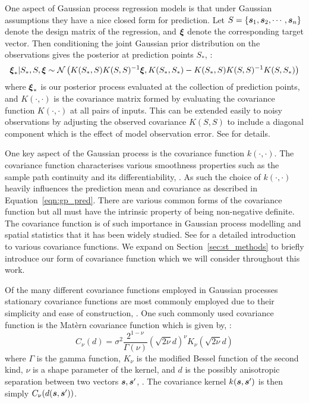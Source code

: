 One aspect of Gaussian process regression models is that under Gaussian assumptions they have a nice closed form for prediction. Let $S = \{ \bm{{s}}_{1}, \bm{{s}}_{2}, \cdots, \bm{{s}}_{n}\}$ denote the design matrix of the regression, and $\bm{{\xi}}$ denote the corresponding target vector. Then conditioning the joint Gaussian prior distribution on the observations gives the posterior at prediction points $S_*$, \citep{williams_gaussian_2006}:
\begin{equation}\label{eqn:gp_pred}
	\bm{{\xi}}_{*} | S_{*}, S, \bm{{\xi}} \sim \mathcal{N}\left(K(S_*, S)K(S, S)^{-1} \bm{{\xi}}, K(S_*, S_*) - K(S_*, S)K(S, S)^{-1}K(S, S_*)\right)
\end{equation}
where $\bm{{\xi}}_{*}$ is our posterior process evaluated at the collection of prediction points, and $K(\cdot, \cdot)$ is the covariance matrix formed by evaluating the covariance function $K(\cdot, \cdot)$ at all pairs of inputs. This can be extended easily to noisy observations by adjusting the observed covariance $K(S, S)$ to include a diagonal component which is the effect of model observation error. See \citep{williams_gaussian_2006} for details.


One key aspect of the Gaussian process is the covariance function $k(\cdot, \cdot)$.
The covariance function characterises various smoothness properties such as the sample path continuity and its differentiability, \citep{williams_gaussian_2006}.
As such the choice of $k(\cdot, \cdot)$ heavily influences the prediction mean and covariance as described in Equation~\eqref{eqn:gp_pred}.
There are various common forms of the covariance function but all must have the intrinsic property of being non-negative definite.
The covariance function is of such importance in Gaussian process modelling and spatial statistics that it has been widely studied.
See \citep[Chapter~4]{williams_gaussian_2006} for a detailed introduction to various covariance functions. We expand on Section~\ref{sec:st_methods} to briefly introduce our form of covariance function which we will consider throughout this work. 

Of the many different covariance functions employed in Gaussian processes stationary covariance functions are most commonly employed due to their simplicity and ease of construction, \citep{cressie_statistics_2010}.
One such commonly used covariance function is the Mat\`{e}rn covariance function which is given by, \citep{abramowitz_handbook_2013}: 
\begin{equation}\label{eqn:mat}
	C_\nu(d) = \sigma^2 \frac{2^{1-\nu}}{\Gamma(\nu)} \left(\sqrt{2\nu}d\right)^\nu K_\nu \left( \sqrt{2\nu}d \right) 
\end{equation}
where $\Gamma$ is the gamma function, $K_\nu$ is the modified Bessel function of the second kind, $\nu$ is a shape parameter of the kernel, and $d$ is the possibly anisotropic separation between two vectors $\bm{{s}}, \bm{{s}}^{\prime}$, \citep{abramowitz_handbook_2013}. 
The covariance kernel $k(\bm{{s}}, \bm{{s}}^{\prime})$ is then simply $C_\nu(d(\bm{{s}}, \bm{{s}}^{\prime}))$. 

